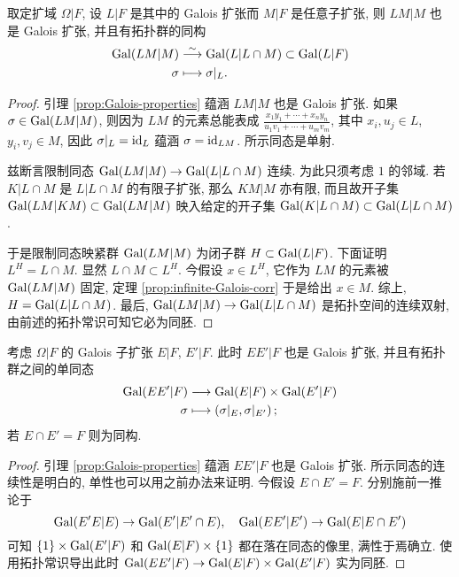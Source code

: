 \begin{corollary}[基变换]\label{prop:Galois-group-basechange}
	取定扩域 $\Omega|F$, 设 $L|F$ 是其中的 Galois 扩张而 $M|F$ 是任意子扩张, 则 $LM|M$ 也是 Galois 扩张, 并且有拓扑群的同构
	\begin{align*}
		\operatorname{Gal}(LM|M) & \stackrel{\sim}{\longrightarrow} \operatorname{Gal}(L|L \cap M) \subset \operatorname{Gal}(L|F) \\
		\sigma & \longmapsto \sigma|_L.
	\end{align*}
\end{corollary}
\begin{proof}
	引理 \ref{prop:Galois-properties} 蕴涵 $LM|M$ 也是 Galois 扩张. 如果 $\sigma \in \operatorname{Gal}(LM|M)$, 则因为 $LM$ 的元素总能表成 $\frac{x_1 y_1 + \cdots + x_n y_n}{u_1 v_1 + \cdots + u_m v_m}$, 其中 $x_i, u_j \in L$, $y_i, v_j \in M$, 因此 $\sigma|_L = \mathrm{id}_L$ 蕴涵 $\sigma = \mathrm{id}_{LM}$. 所示同态是单射.

	兹断言限制同态 $\operatorname{Gal}(LM|M) \to \operatorname{Gal}(L|L \cap M)$ 连续. 为此只须考虑 $1$ 的邻域. 若 $K|L \cap M$ 是 $L|L \cap M$ 的有限子扩张, 那么 $KM|M$ 亦有限, 而且故开子集 $\operatorname{Gal}(LM|KM) \subset \operatorname{Gal}(LM|M)$ 映入给定的开子集 $\operatorname{Gal}(K|L \cap M) \subset \operatorname{Gal}(L|L \cap M)$.

	于是限制同态映紧群 $\operatorname{Gal}(LM|M)$ 为闭子群 $H \subset \operatorname{Gal}(L|F)$. 下面证明 $L^H = L \cap M$. 显然 $L \cap M \subset L^H$. 今假设 $x \in L^H$, 它作为 $LM$ 的元素被 $\operatorname{Gal}(LM|M)$ 固定, 定理 \ref{prop:infinite-Galois-corr} 于是给出 $x \in M$. 综上, $H = \operatorname{Gal}(L|L \cap M)$. 最后, $\operatorname{Gal}(LM|M) \to \operatorname{Gal}(L|L \cap M)$ 是拓扑空间的连续双射, 由前述的拓扑常识可知它必为同胚.
\end{proof}

\begin{corollary}\label{prop:Galois-group-compositum}
	考虑 $\Omega|F$ 的 Galois 子扩张 $E|F$, $E'|F$. 此时 $EE'|F$ 也是 Galois 扩张, 并且有拓扑群之间的单同态
	\begin{align*}
		\operatorname{Gal}(EE'|F) & \longrightarrow \operatorname{Gal}(E|F) \times \operatorname{Gal}(E'|F) \\
		\sigma & \longmapsto \left( \sigma|_E, \sigma|_{E'} \right);
	\end{align*}
	若 $E \cap E' = F$ 则为同构.
\end{corollary}
\begin{proof}
	引理 \ref{prop:Galois-properties} 蕴涵 $EE'|F$ 也是 Galois 扩张. 所示同态的连续性是明白的, 单性也可以用之前办法来证明. 今假设 $E \cap E' = F$. 分别施前一推论于
	\[ \operatorname{Gal}(E'E|E) \to \operatorname{Gal}(E'| E' \cap E), \quad \operatorname{Gal}(EE'|E') \to \operatorname{Gal}(E | E \cap E') \]
	可知 $\{1\} \times \operatorname{Gal}(E'|F)$ 和 $\operatorname{Gal}(E|F) \times \{1\}$ 都在落在同态的像里, 满性于焉确立. 使用拓扑常识导出此时 $\operatorname{Gal}(EE'|F) \to \operatorname{Gal}(E|F) \times \operatorname{Gal}(E'|F)$ 实为同胚.
\end{proof}

